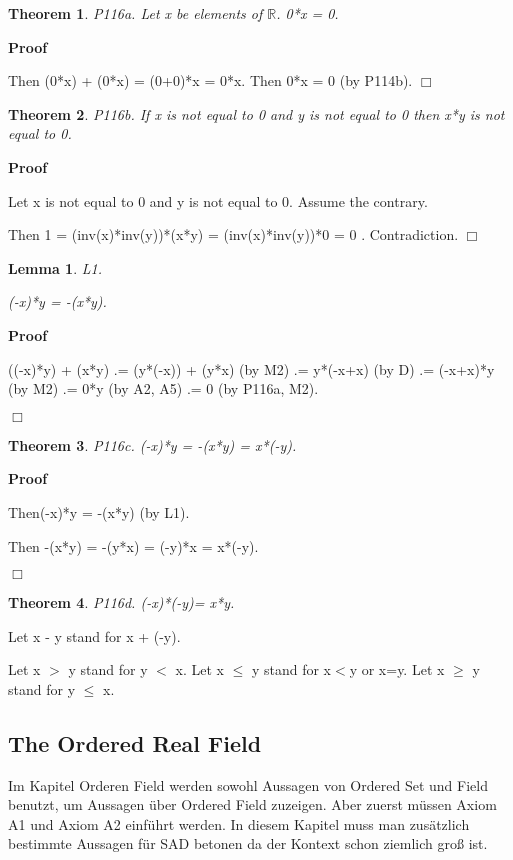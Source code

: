 \documentclass{article}
\newenvironment{forthel}{\begin{leftbar}}{\end{leftbar}}
\newenvironment{proof}{\noindent\textbf{Proof\ }}{\hspace*{\fill}$\Box$\medskip}
\newtheorem{lemma}{Lemma}
\newtheorem{theorem}{Theorem}
\begin{document}
\begin{forthel}
\begin{theorem}
 P116a.
Let x be elements of $\mathbb{R}$. 0*x = 0.\end{theorem}
\begin{proof}

Then (0*x) + (0*x)
= (0+0)*x
= 0*x.
Then 0*x = 0 (by P114b).
\end{proof}

\begin{theorem}
 P116b. 
If x is not equal to 0 and y is not equal to 0 then x*y is not equal to 0.\end{theorem}
\begin{proof}


Let x is not equal to 0 and y is not equal to 0.
Assume the contrary.

Then 1 = (inv(x)*inv(y))*(x*y)
= (inv(x)*inv(y))*0
= 0 .
Contradiction.
\end{proof}


\begin{lemma} L1.


(-x)*y = -(x*y).\end{lemma}
\begin{proof}


((-x)*y) + (x*y) .= (y*(-x)) + (y*x) (by M2)
.= y*(-x+x) (by D) 
.= (-x+x)*y (by M2)
.= 0*y (by A2, A5)
.= 0 (by P116a, M2).

\end{proof}
 
\begin{theorem}
 P116c.
(-x)*y = -(x*y) = x*(-y).\end{theorem}
\begin{proof}

Then(-x)*y = -(x*y) (by L1).

Then -(x*y) = -(y*x) = (-y)*x = x*(-y).

\end{proof}
 

\begin{theorem}
 P116d.
(-x)*(-y)= x*y.\end{theorem}


Let x - y stand for x + (-y).


Let x $>$ y stand for y $<$ x.
Let x $\leq$ y stand for x$<$y or x=y.
Let x $\geq$ y stand for y $\leq$ x.



\end{forthel}

\subsection{The Ordered Real Field}
Im Kapitel Orderen Field werden sowohl Aussagen von Ordered Set und Field benutzt, um Aussagen über Ordered Field zuzeigen.
Aber zuerst müssen Axiom A1 und Axiom A2 einführt werden.
In diesem Kapitel muss man zusätzlich bestimmte Aussagen für SAD betonen da der Kontext schon ziemlich groß ist.
\end{document}
